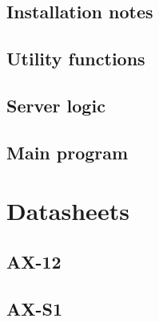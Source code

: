 \documentclass{book}
\begin{document}
\section{Installation notes}


\section{Utility functions}



\section{Server logic}


\section{Main program}


\chapter{Datasheets}
\section{AX-12}

\section{AX-S1}

\end{document}
